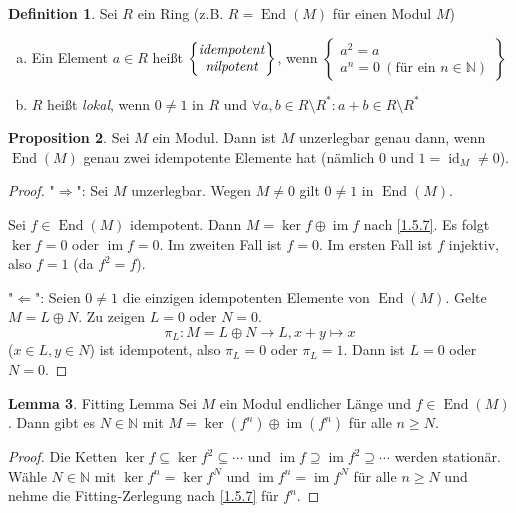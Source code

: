 \documentclass[
twoside=semi,
fontsize=12,
DIV=12, 
cleardoublepage=current,
leqno,
headings=optiontoheadandtoc, 
toc=idx
]{scrbook}
\newcommand{\N}{\mathbb{N}}
\newcommand{\textcase}[2]{$\begin{Bmatrix} \textrm{#1} \\ \textrm{#2}\end{Bmatrix}$}
\newcommand{\case}[2]{\begin{Bmatrix} #1 \\ #2\end{Bmatrix}}
\DeclareMathOperator{\im}{im}
\DeclareMathOperator{\id}{id}
\DeclareMathOperator{\End}{End}
\theoremstyle{definition}
\newtheorem{definition}{Definition}[section]
\newtheorem{lemma}[definition]{Lemma}
\newtheorem{proposition}[definition]{Proposition}
\begin{document}
	\begin{definition}\label{1.5.8}\hfill\newline
		Sei $R$ ein Ring (z.B. $R = \End(M)$ f\"ur einen Modul $M$)
		
		\begin{enumerate}[(a)]
			\item Ein Element $a \in R$ hei\ss t \textcase{\emph{idempotent}\index{Modul@\textbf{Modul}!idempotent}}{\emph{nilpotent}\index{Modul@\textbf{Modul}!nilpotent}}, wenn $\case{a^2 = a}{a^n = 0  \ (\textrm{f\"ur ein } n \in \N)}$ 
			
			\item $R$ hei\ss t \emph{lokal}, wenn $0\neq 1$ in $R$ und $\forall a,b \in R\setminus R^*: a + b \in R\setminus R^*$
		\end{enumerate}
	\end{definition}

	\begin{proposition}\label{1.5.9}\hfill\newline
		Sei $M$ ein Modul. Dann ist $M$ unzerlegbar genau dann, wenn $\End(M)$ genau zwei idempotente Elemente hat (n\"amlich $0$ und $1 = \id_M \neq 0$).
		
		\begin{proof}\hfill\newline
			"$\Longrightarrow$": Sei $M$ unzerlegbar. Wegen $M \neq 0$ gilt $0 \neq 1$ in $\End(M)$.
			
			Sei $f \in \End(M)$ idempotent. Dann $M = \ker f \oplus \im f$ nach \ref{1.5.7}. Es folgt $\ker f = 0$ oder $\im f = 0$. Im zweiten Fall ist $f = 0$. Im ersten Fall ist $f$ injektiv, also $f=1$ (da $f^2 = f$).
			
			\medskip\noindent
			"$\Longleftarrow$": Seien $0\neq 1$ die einzigen idempotenten Elemente von $\End(M)$. Gelte $M = L \oplus N$. Zu zeigen $L = 0$ oder $N = 0$. 
			\[\pi_L:M=L\oplus N \to L, x + y \mapsto x\]
			($x\in L, y \in N$) ist idempotent, also $\pi_L = 0$ oder $\pi_L = 1$. Dann ist $L = 0$ oder $N = 0$.
		\end{proof}
	\end{proposition}

	\begin{lemma}\label{1.5.10} Fitting Lemma\newline
		Sei $M$ ein Modul endlicher L\"ange und $f \in \End(M)$. Dann gibt es $N \in \N$ mit \linebreak $M = \ker(f^n) \oplus \im(f^n)$ f\"ur alle $n\geq N$.
		
		\begin{proof}
			Die Ketten $\ker f \subseteq \ker f^2 \subseteq \cdots$ und $\im f \supseteq \im f^2 \supseteq \cdots$ werden station\"ar. W\"ahle $N \in \N$ mit $\ker f^n = \ker f^N$ und $\im f^n = \im f^N$ f\"ur alle $n \geq N$ und nehme die Fitting-Zerlegung nach \ref{1.5.7} f\"ur $f^n$.
		\end{proof}
	\end{lemma}
\end{document}
